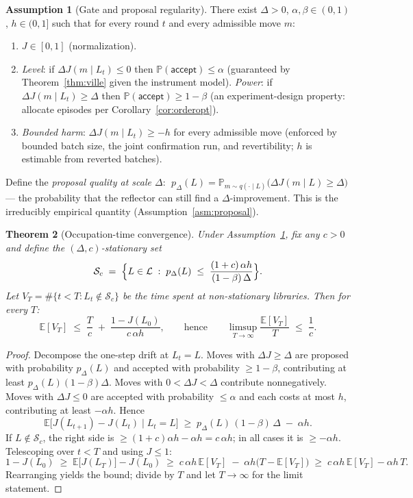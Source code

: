 \documentclass[11pt]{article}
\theoremstyle{plain}
\newtheorem{theorem}{Theorem}[section]
\theoremstyle{definition}
\newtheorem{assumption}[theorem]{Assumption}
\theoremstyle{remark}
\newcommand{\E}{\mathbb{E}}
\newcommand{\Prob}{\mathbb{P}}
\newcommand{\cL}{\mathcal{L}}
\newcommand{\cS}{\mathcal{S}}
\begin{document}
\begin{assumption}[Gate and proposal regularity]\label{asm:gate}
There exist $\Delta > 0$, $\alpha, \beta \in (0,1)$, $h \in (0,1]$ such that
for every round $t$ and every admissible move $m$:
\begin{enumerate}[label=(D\arabic*),leftmargin=3em]
  \item $J \in [0,1]$ (normalization).
  \item \emph{Level}: if $\Delta J(m \mid L_t) \le 0$ then
        $\Prob(\textsf{accept}) \le \alpha$
        \textup{(guaranteed by Theorem~\ref{thm:ville} given the instrument
        model)}. \emph{Power}: if $\Delta J(m \mid L_t) \ge \Delta$ then
        $\Prob(\textsf{accept}) \ge 1 - \beta$ \textup{(an experiment-design
        property: allocate episodes per Corollary~\ref{cor:orderopt})}.
  \item \emph{Bounded harm}: $\Delta J(m \mid L_t) \ge -h$ for every
        admissible move \textup{(enforced by bounded batch size, the joint
        confirmation run, and revertibility; $h$ is estimable from reverted
        batches)}.
\end{enumerate}
Define the \emph{proposal quality at scale $\Delta$}:
$\;p_\Delta(L) = \Prob_{m \sim q(\cdot \mid L)}\bigl( \Delta J(m \mid L) \ge
\Delta \bigr)$ --- the probability that the reflector can still find a
$\Delta$-improvement. This is the irreducibly empirical quantity
(Assumption~\ref{asm:proposal}).
\end{assumption}

\begin{theorem}[Occupation-time convergence]\label{thm:drift}
Under Assumption~\ref{asm:gate}, fix any $c > 0$ and define the
\emph{$(\Delta, c)$-stationary set}
\[
  \cS_c \;=\; \Bigl\{ L \in \cL \;:\;
  p_\Delta(L) \;\le\; \frac{(1+c)\,\alpha h}{(1-\beta)\,\Delta} \Bigr\}.
\]
Let $V_T = \#\{ t < T : L_t \notin \cS_c \}$ be the time spent at
non-stationary libraries. Then for every $T$:
\[
  \E[V_T] \;\le\; \frac{T}{c} \;+\; \frac{1 - J(L_0)}{c\,\alpha h},
  \qquad\text{hence}\qquad
  \limsup_{T \to \infty} \frac{\E[V_T]}{T} \;\le\; \frac1c .
\]
\end{theorem}

\begin{proof}
Decompose the one-step drift at $L_t = L$. Moves with $\Delta J \ge \Delta$
are proposed with probability $p_\Delta(L)$ and accepted with probability
$\ge 1 - \beta$, contributing at least $p_\Delta(L)(1-\beta)\Delta$. Moves
with $0 < \Delta J < \Delta$ contribute nonnegatively. Moves with $\Delta J
\le 0$ are accepted with probability $\le \alpha$ and each costs at most $h$,
contributing at least $-\alpha h$. Hence
\[
  \E\bigl[ J(L_{t+1}) - J(L_t) \mid L_t = L \bigr]
  \;\ge\; p_\Delta(L)\,(1-\beta)\,\Delta \;-\; \alpha h .
\]
If $L \notin \cS_c$, the right side is $\ge (1+c)\alpha h - \alpha h = c\,
\alpha h$; in all cases it is $\ge -\alpha h$. Telescoping over $t < T$ and
using $J \le 1$:
\[
  1 - J(L_0) \;\ge\; \E\bigl[J(L_T)\bigr] - J(L_0)
  \;\ge\; c\,\alpha h\, \E[V_T] \;-\; \alpha h \bigl( T - \E[V_T] \bigr)
  \;\ge\; c\,\alpha h\, \E[V_T] - \alpha h\, T .
\]
Rearranging yields the bound; divide by $T$ and let $T \to \infty$ for the
limit statement.
\end{proof}
\end{document}
